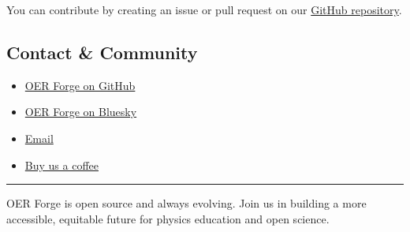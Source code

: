 You can contribute by creating an issue or pull request on our
\href{https://github.com/open-physics-ed/open-physics-ed-org.github.io}{GitHub
repository}.

\subsection{Contact \& Community}\label{contact-community}

\begin{itemize}
\tightlist
\item
  \href{https://github.com/OER-Forge}{OER Forge on GitHub}
\item
  \href{https://bsky.app/profile/oerforge.org}{OER Forge on Bluesky}
\item
  \href{mailto:hello@oerforge.org}{Email}
\item
  \href{https://www.buymeacoffee.com/dannycab}{Buy us a coffee}
\end{itemize}

\begin{center}\rule{0.5\linewidth}{0.5pt}\end{center}

OER Forge is open source and always evolving. Join us in building a more
accessible, equitable future for physics education and open science.
